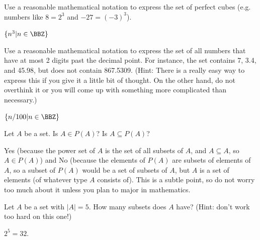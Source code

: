 \begin{requ}
Use a reasonable mathematical notation to express the set of perfect cubes (e.g. numbers like $8=2^3$ and $-27=(-3)^3$).
\begin{requanswer}
$\{n^3 | n\in \BBZ\}$
\end{requanswer}
\end{requ}

\begin{requ}
Use a reasonable mathematical notation to express the set of all numbers that have at most 2 digits past the decimal point.
For instance, the set contains 7, 3.4, and 45.98, but does not contain 867.5309.
(Hint: There is a really easy way to express this if you give it a little bit of thought. On the other hand, do not overthink it
or you will come up with something more complicated than necessary.)
\begin{requanswer}
$\{n/100 | n\in \BBZ\}$
\end{requanswer}
\end{requ}

\begin{requ}
Let $A$ be a set. Is $A\in P(A)$? Is $A\subseteq P(A)$?
\begin{requanswer}
Yes (because the power set of $A$ is the set of all subsets of $A$, and $A\subseteq A$, so $A\in P(A)$)
and No (because the elements of $P(A)$ are subsets of elements of $A$, so a subset of $P(A)$ would
be a set of subsets of $A$, but $A$ is a set of elements (of whatever type $A$ consists of).
This is a subtle point, so do not worry too much about it unless you plan to major in mathematics.
\end{requanswer}
\end{requ}

\begin{requ}
Let $A$ be a set with $|A|=5$. How many subsets does $A$ have? (Hint: don't work too hard on this one!)
\begin{requanswer}
$2^5=32$.
\end{requanswer}
\end{requ}

